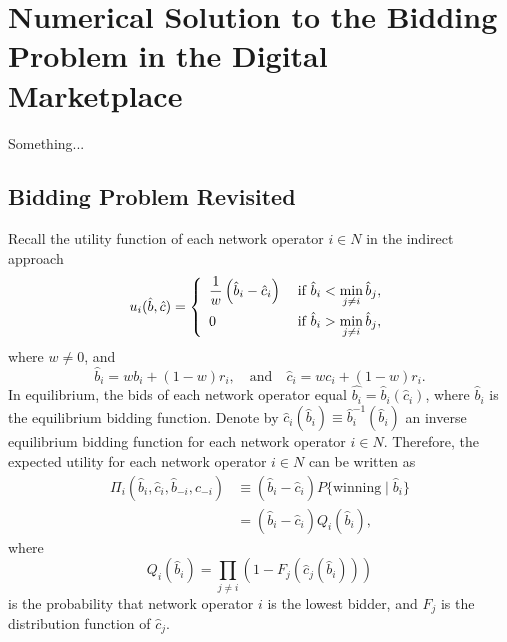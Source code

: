 \chapter{Numerical Solution to the Bidding Problem in the Digital Marketplace}
\label{cha:numerical_solution_to_the_bidding_problem_in_the_digital_marketplace}

\minitoc
\vspace{10mm}

Something...\cite{Katzwer2012}

\section{Bidding Problem Revisited}
\label{sec:bidding_problem_revisited_numerical}
Recall the utility function of each network operator $i\in N$ in the indirect approach
\begin{equation*}
  u_i(\hat{b},\hat{c}) = \left\{
  \begin{array}{l l}
    \displaystyle\frac{1}{w}\left(\hat{b}_i-\hat{c}_i\right) & \;\text{if } \hat{b}_i < \displaystyle\min_{j\neq i}\hat{b}_j,\\[2ex]
    0 & \;\text{if } \hat{b}_i > \displaystyle\min_{j\neq i}\hat{b}_j,
  \end{array}\right.
\end{equation*}
where $w\neq 0$, and
\begin{equation*}
  \hat{b}_i = wb_i + (1-w)r_i, \quad\text{and}\quad \hat{c}_i = wc_i + (1-w)r_i.
\end{equation*}
In equilibrium, the bids of each network operator equal $\hat{b_i} = \hat{b}_i(\hat{c}_i)$, where $\hat{b}_i$ is the equilibrium bidding function. Denote by $\hat{c}_i(\hat{b}_i)\equiv \hat{b}_i^{-1}(\hat{b}_i)$ an inverse equilibrium bidding function for each network operator $i\in N$. Therefore, the expected utility for each network operator $i\in N$ can be written as
\begin{align*}
  \Pi_i(\hat{b}_i,\hat{c}_i,\hat{b}_{-i},\hat{c}_{-i})
  &\equiv (\hat{b}_i - \hat{c}_i)P\{\text{winning}\mid\hat{b}_i\}\\
  &= (\hat{b}_i - \hat{c}_i)Q_i(\hat{b}_i),
\end{align*}
where
\begin{equation*}
Q_i(\hat{b}_i) = \prod_{j\neq i}\left( 1 - F_j(\hat{c}_j(\hat{b}_i)) \right)
\end{equation*}
is the probability that network operator $i$ is the lowest bidder, and $F_j$ is the distribution function of $\hat{c}_j$.

